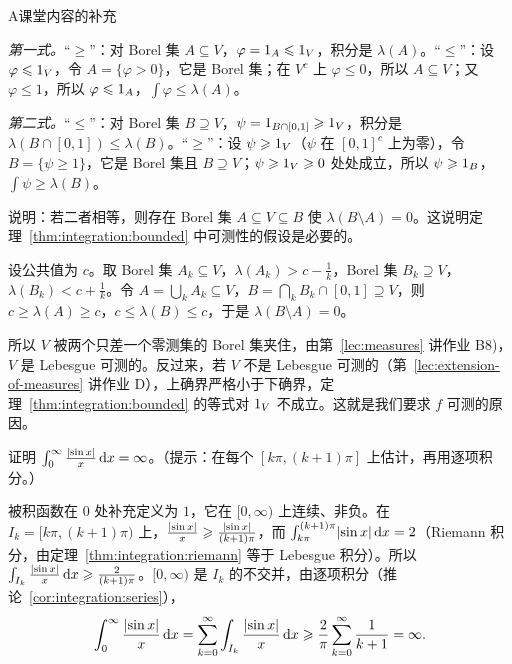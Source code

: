 \begin{exercises}{A}{课堂内容的补充}
\begin{questions}
\begin{solution}
\emph{第一式。}“$\geqslant$”：对 Borel 集 $A\subseteq V$，$\varphi=1_A\leqslant1_V$，积分是 $\lambda(A)$。“$\leqslant$”：设 $\varphi\leqslant1_V$，令 $A=\{\varphi>0\}$，它是 Borel 集；在 $V^c$ 上 $\varphi\leqslant0$，所以 $A\subseteq V$；又 $\varphi\leqslant1$，所以 $\varphi\leqslant1_A$，$\int\varphi\leqslant\lambda(A)$。

\emph{第二式。}“$\leqslant$”：对 Borel 集 $B\supseteq V$，$\psi=1_{B\cap[0,1]}\geqslant1_V$，积分是 $\lambda(B\cap[0,1])\leqslant\lambda(B)$。“$\geqslant$”：设 $\psi\geqslant1_V$（$\psi$ 在 $[0,1]^c$ 上为零），令 $B=\{\psi\geqslant1\}$，它是 Borel 集且 $B\supseteq V$；$\psi\geqslant1_V\geqslant0$ 处处成立，所以 $\psi\geqslant1_B$，$\int\psi\geqslant\lambda(B)$。
\end{solution}
\item 说明：若二者相等，则存在 Borel 集 $A\subseteq V\subseteq B$ 使 $\lambda(B\setminus A)=0$。这说明定理~\ref{thm:integration:bounded} 中可测性的假设是必要的。
\begin{solution}
设公共值为 $c$。取 Borel 集 $A_k\subseteq V$，$\lambda(A_k)>c-\frac1k$，Borel 集 $B_k\supseteq V$，$\lambda(B_k)<c+\frac1k$。令 $A=\bigcup_kA_k\subseteq V$，$B=\bigcap_kB_k\cap[0,1]\supseteq V$，则 $c\geqslant\lambda(A)\geqslant c$，$c\leqslant\lambda(B)\leqslant c$，于是 $\lambda(B\setminus A)=0$。

所以 $V$ 被两个只差一个零测集的 Borel 集夹住，由第~\ref{lec:measures} 讲作业 B8)，$V$ 是 Lebesgue 可测的。反过来，若 $V$ 不是 Lebesgue 可测的（第~\ref{lec:extension-of-measures} 讲作业 D），上确界严格小于下确界，定理~\ref{thm:integration:bounded} 的等式对 $1_V$ 不成立。这就是我们要求 $f$ 可测的原因。
\end{solution}
\end{questions}

\item\label{ex:integration:A9} 证明 $\int_0^\infty\frac{\lvert \sin x\rvert}x\,\mathrm{d} x=\infty$。（提示：在每个 $[k\pi,(k+1)\pi]$ 上估计，再用逐项积分。）
\begin{solution}
被积函数在 $0$ 处补充定义为 $1$，它在 $[0,\infty)$ 上连续、非负。在 $I_k=[k\pi,(k+1)\pi)$ 上，$\frac{\lvert \sin x\rvert}x\geqslant\frac{\lvert \sin x\rvert}{(k+1)\pi}$，而 $\int_{k\pi}^{(k+1)\pi}\lvert \sin x\rvert\,\mathrm{d} x=2$（Riemann 积分，由定理~\ref{thm:integration:riemann} 等于 Lebesgue 积分）。所以 $\int_{I_k}\frac{\lvert \sin x\rvert}x\,\mathrm{d} x\geqslant\frac2{(k+1)\pi}$。$[0,\infty)$ 是 $I_k$ 的不交并，由逐项积分（推论~\ref{cor:integration:series}），
\[
\int_0^\infty\frac{\lvert \sin x\rvert}x\,\mathrm{d} x=\sum_{k=0}^\infty\int_{I_k}\frac{\lvert \sin x\rvert}x\,\mathrm{d} x\geqslant\frac2\pi\sum_{k=0}^\infty\frac1{k+1}=\infty .
\]
\end{solution}


\end{exercises}

